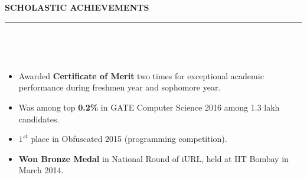 \documentclass[a4paper,10pt]{article}
\newcommand{\isep}{-2 pt}
\newcommand{\lsep}{-0.5cm}
\newcommand{\resheading}[1]{{\small
        {
            \begin{minipage}
                {0.975\textwidth}\textbf{{\textsc{#1 \vphantom{p\^{E}} }}}
                \\[-0.3cm]
                \hrule
            \end{minipage}
            \\[-0.5cm]
        }
 }}
\begin{document}
\resheading{\textbf{\large SCHOLASTIC ACHIEVEMENTS}}\\[\lsep]
\begin{itemize}\itemsep \isep
    \item Awarded \textbf{Certificate of Merit} two times for exceptional academic performance during freshmen year and sophomore year.
    \item Was among top \textbf{0.2\%} in GATE Computer Science 2016 among 1.3 lakh candidates.
    \item \textbf{$1^{st}$} place in Obfuscated 2015 (programming competition).
    \item \textbf{Won Bronze Medal} in National Round of iURL, held at IIT Bombay in March 2014.
\end{itemize}
\end{document}
